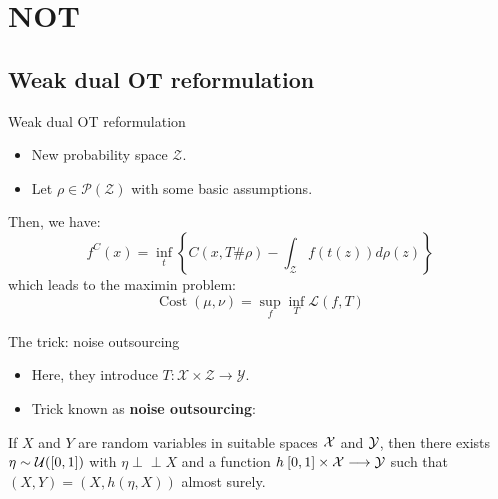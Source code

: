 \documentclass{beamer}
\DeclareMathOperator*{\Cost}{\text{Cost}}
\newcommand{\indep}{\perp \!\!\! \perp}
\begin{document}
\section{NOT}

\subsection{Weak dual OT reformulation}
\begin{frame}{Weak dual OT reformulation}
    \begin{itemize}
        \item New probability space $\mathcal{Z}$.
        \item Let $\rho\in \mathcal{P}(\mathcal{Z})$ with some basic assumptions.
    \end{itemize}
    Then, we have:
    \begin{equation}
        f^C(x)=\inf_t \left\{C(x, T\#\rho)-\int_{\mathcal{Z}}f(t(z))d\rho(z)\right\}
    \end{equation}
    which leads to the maximin problem:
    \begin{equation}
        \Cost(\mu,\nu) = \sup_{f} \inf_{T} \mathcal{L}(f,T)
    \end{equation}


\end{frame}

\begin{frame}{The trick: noise outsourcing}
    \begin{itemize}
        \item Here, they introduce $T:\mathcal{X}\times\mathcal{Z}\to\mathcal{Y}$.
        \item Trick known as \textbf{noise outsourcing}:
    \end{itemize}

    \begin{theorem}
        If $X$ and $Y$ are random variables in suitable spaces ${\cal X}$ and ${\cal Y}$, then there exists $\eta\sim {\cal U}([0,1])$ with $\eta \indep X$ and a function $h\: [0, 1]\times {\cal X} \longrightarrow {\cal Y}$ such that $(X, Y) = (X, h(\eta, X))$ almost surely.
    \end{theorem}
\end{frame}
\end{document}
